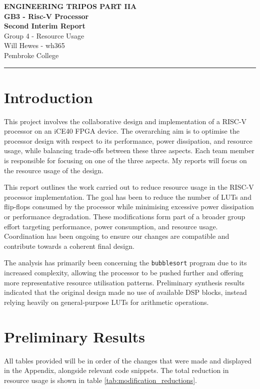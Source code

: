 \documentclass[a4paper,10pt]{article}
\renewcommand{\maketitle}{
    \begin{center}
        \LARGE \textbf{ENGINEERING TRIPOS PART IIA} \\ 
        \vspace{0.5em}
        \Large \textbf{GB3 - Risc-V Processor} \\ 
        \vspace{0.5em}
        \textbf{Second Interim Report} \\
        \large Group 4 - Resource Usage \\
        \vspace{1em}
        \large Will Hewes - wh365 \\ 
        Pembroke College \\ 
        \vspace{0.5em}
    \end{center}
}
\begin{document}

\maketitle
\hrule
\tableofcontents
\newpage

\section{Introduction}
\label{sec:Introduction}

This project involves the collaborative design and implementation 
of a RISC-V processor on an iCE40 FPGA device. 
The overarching aim is to optimise 
the processor design with respect to its 
performance, power dissipation, and resource usage, 
while balancing trade-offs between these three aspects. 
Each team member is responsible for focusing on one of the three aspects.
My reports will focus on the resource usage of the design.

This report outlines the work carried out to reduce resource usage 
in the RISC-V processor implementation. 
The goal has been to reduce the number of LUTs and flip-flops consumed
by the processor while minimising 
excessive power dissipation or performance degradation.
These modifications form part of a broader group effort targeting performance, 
power consumption, and resource usage. 
Coordination has been ongoing to ensure our changes are compatible and 
contribute towards a coherent final design.

The analysis has primarily been concerning the
\texttt{bubblesort} program due to its increased complexity,
allowing the processor to be pushed further and 
offering more representative resource utilisation patterns.
Preliminary synthesis results indicated that the original design 
made no use of available DSP blocks, 
instead relying heavily on general-purpose LUTs for arithmetic operations.

\section{Preliminary Results}
\label{sec:Preliminary_Results}
All tables provided will be in order of the changes that were made
and displayed in the Appendix, alongside relevant code snippets.
The total reduction in resource usage is 
shown in table \ref{tab:modification_reductions}.
\end{document}
